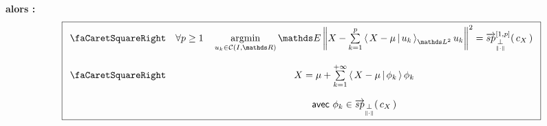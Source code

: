 \begin{minipage}{\textwidth}
\begin{thm}
		\textbf{alors :}
		\begin{equation*}
			\boxed{
				\begin{array}{cc}
					\textsf{\faCaretSquareRight} &

					\forall p \geq 1
					\quad
					\argmin\limits_{u_k \in \mathcal C(I, \mathds R)} \mathds E \left\Vert X - \sum\limits_{k=1}^p \prodscalselon {X - \mu} {u_k} {\mathds L^2} u_k \right\Vert^2 = \overrightarrow{sp}_{\orthonormal}^{[1,p]}( \, c_X \, )

					\\
					\\
					\textsf{\faCaretSquareRight} & X = \mu + \sum\limits_{k=1}^{+\infty} \prodscal {X - \mu} {\phi_k} \phi_k
					\\
					                             &
					\\
					                             & \textsf{avec } \phi_k \in \overrightarrow{sp}_{\orthonormal}( \, c_X \, )
				\end{array}
			}
		\end{equation*}

		\label{thm:KL}
	\end{thm}
\end{minipage}
